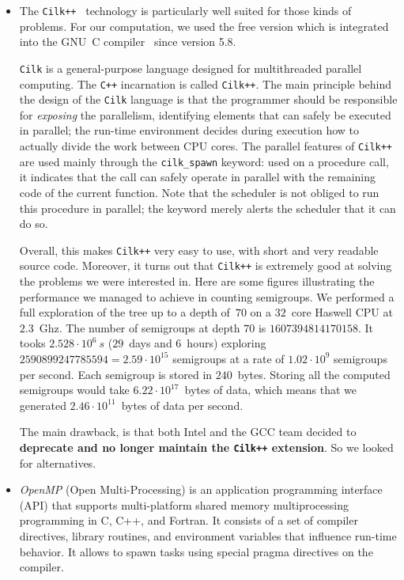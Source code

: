 \documentclass{deliverablereport}
\newcommand{\Cilk}{\texttt{Cilk}\xspace}
\newcommand{\CilkP}{\texttt{Cilk++}\xspace}
\newcommand{\CPP}{\texttt{C++}\xspace}
\begin{document}
\begin{itemize}
\item The \CilkP~\cite{CilkIntel} technology is particularly well suited for
  those kinds of problems. For our computation, we used the free version which
  is integrated into the GNU~C compiler~\cite{GCCcilk} since version 5.8.

  \Cilk is a general-purpose language designed for multithreaded parallel
  computing. The \CPP incarnation is called \CilkP. The main principle
  behind the design of the \Cilk language is that the programmer should be
  responsible for \emph{exposing} the parallelism, identifying elements that
  can safely be executed in parallel; the run-time environment decides during
  execution how to actually divide the work between CPU cores. The parallel
  features of \CilkP are used mainly through the \texttt{cilk\_spawn} keyword:
  used on a procedure call, it indicates that the call can safely operate in
  parallel with the remaining code of the current function. Note that the
  scheduler is not obliged to run this procedure in parallel; the keyword
  merely alerts the scheduler that it can do so.

  Overall, this makes \CilkP very easy to use, with short and very readable
  source code. Moreover, it turns out that \CilkP is extremely good at solving
  the problems we were interested in. Here are some figures illustrating the performance we managed
  to achieve in counting semigroups. We performed a full exploration of the tree up to a depth of~$70$ on
  a $32$~core Haswell CPU at $2.3$~Ghz. The number of semigroups at depth $70$ is
  $1607394814170158$.  It tooks $2.528\cdot10^{6}~s$ ($29$~days and $6$~hours)
  exploring $2590899247785594=2.59\cdot10^{15}$ semigroups at a rate of
  $1.02\cdot10^{9}$ semigroups per second. Each semigroup is stored in
  $240$~bytes. Storing all the computed semigroups would take
  $6.22\cdot10^{17}$~bytes of data, which means that we generated
  $2.46\cdot10^{11}$~bytes of data per second.

  The main drawback, is that both Intel and the GCC team decided
  to \textbf{deprecate and no longer maintain the \CilkP extension}. So we
  looked for alternatives.


\item \emph{OpenMP} (Open Multi-Processing) is an application programming
  interface (API) that supports multi-platform shared memory multiprocessing
  programming in C, C++, and Fortran. It consists of a set of compiler
  directives, library routines, and environment variables that influence
  run-time behavior. It allows to spawn tasks using special pragma directives on the
  compiler.


\end{itemize}
\end{document}
